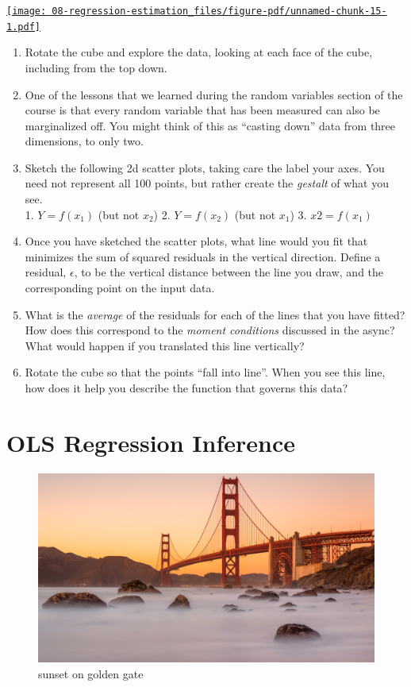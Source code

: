 \documentclass[
  letterpaper,
  DIV=11,
  numbers=noendperiod]{scrreprt}
\providecommand{\tightlist}{%
  \setlength{\itemsep}{0pt}\setlength{\parskip}{0pt}}\usepackage{longtable,booktabs,array}
\begin{document}
\href{http://www.statistics.wtf/minibeta01/}{\texttt{[image: 08-regression-estimation\_files/figure-pdf/unnamed-chunk-15-1.pdf]}}

\begin{enumerate}
\def\labelenumi{\arabic{enumi}.}
\tightlist
\item
  Rotate the cube and explore the data, looking at each face of the
  cube, including from the top down.
\item
  One of the lessons that we learned during the random variables section
  of the course is that every random variable that has been measured can
  also be marginalized off. You might think of this as ``casting down''
  data from three dimensions, to only two.
\item
  Sketch the following 2d scatter plots, taking care the label your
  axes. You need not represent all 100 points, but rather create the
  \emph{gestalt} of what you see.\\
  1. \(Y = f(x_1)\) (but not \(x_2\)) 2. \(Y = f(x_2)\) (but not
  \(x_1\)) 3. \(x2 = f(x_1)\)
\item
  Once you have sketched the scatter plots, what line would you fit that
  minimizes the sum of squared residuals in the vertical direction.
  Define a residual, \(\epsilon\), to be the vertical distance between
  the line you draw, and the corresponding point on the input data.
\item
  What is the \emph{average} of the residuals for each of the lines that
  you have fitted? How does this correspond to the \emph{moment
  conditions} discussed in the async? What would happen if you
  translated this line vertically?
\item
  Rotate the cube so that the points ``fall into line''. When you see
  this line, how does it help you describe the function that governs
  this data?
\end{enumerate}

\chapter{OLS Regression Inference}\label{ols-regression-inference}

\begin{figure}[H]

{\centering \includegraphics{./images/bridge_sunset.jpeg}

}

\caption{sunset on golden gate}

\end{figure}%
\end{document}
